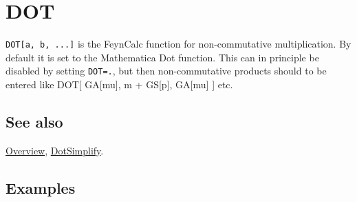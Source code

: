 \documentclass[../FeynCalcManual.tex]{subfiles}
\begin{document}
\hypertarget{dot}{%
\section{DOT}\label{dot}}

\texttt{DOT[\allowbreak{}a,\ \allowbreak{}b,\ \allowbreak{}...]} is the
FeynCalc function for non-commutative multiplication. By default it is
set to the Mathematica Dot function. This can in principle be disabled
by setting \texttt{DOT=.}, but then non-commutative products should to
be entered like DOT{[} GA{[}mu{]}, m + GS{[}p{]}, GA{[}mu{]} {]} etc.

\subsection{See also}

\hyperlink{toc}{Overview}, \hyperlink{dotsimplify}{DotSimplify}.

\subsection{Examples}
\end{document}
